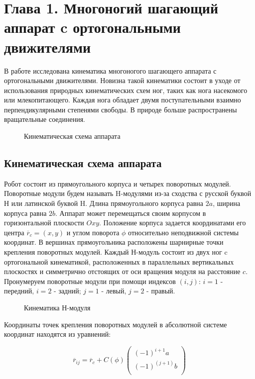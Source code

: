 \chapter*{Глава 1. Многоногий шагающий аппарат c ортогональными движителями}
В работе исследована кинематика многоногого шагающего аппарата с ортогональными движителями. Новизна такой кинематики состоит в уходе от использования природных кинематических схем ног, таких как нога насекомого или млекопитающего. Каждая нога обладает двумя поступательными взаимно перпендикулярными степенями свободы. В природе больше распространены вращательные соединения.

\begin{figure}[h]
\caption{Кинематическая схема аппарата}
\end{figure}

\section{Кинематическая схема аппарата}
Робот состоит из прямоугольного корпуса и четырех поворотных модулей. Поворотные модули будем называть H-модулями из-за сходства с русской буквой Н или латинской буквой H. Длина прямоугольного корпуса равна $2a$, ширина корпуса равна $2b$. Аппарат может перемещаться своим корпусом в горизонтальной плоскости $Oxy$. Положение корпуса задается координатами его центра $\overline{r}_c = (x,y)$ и углом поворота $\phi$ относительно неподвижной системы координат. В вершинах прямоугольника расположены шарнирные точки крепления поворотных модулей. Каждый Н-модуль состоит из двух ног c ортогональной кинематикой, расположенных в параллельных вертикальных плоскостях и симметрично отстоящих от оси вращения модуля на расстояние $c$. Пронумеруем поворотные модули при помощи индексов $(i,j)$: $i = 1$ - передний, $i = 2$ - задний; $j = 1$ - левый, $j = 2$ - правый.

\begin{figure}[h]
\caption{Кинематика Н-модуля}
\end{figure}

Координаты точек крепления поворотных модулей в абсолютной системе координат находятся из уравнений:

\begin{equation}
	\overline{r}_{ij} = \overline{r}_c+C(\phi)\left(
	\begin{array}{c}
	(-1)^{i+1}a\\
	(-1)^(j+1)b\\
	\end{array}\right)
\end{equation}

